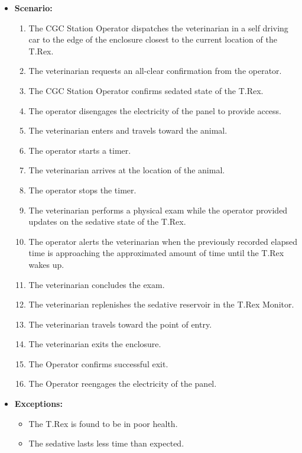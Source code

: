 \documentclass[12pt]{article}
\begin{document}
\begin{itemize}
        \item[]\textbf{Scenario:}
            \begin{enumerate}
                \item The CGC Station Operator dispatches the veterinarian in a self driving car
                to the edge of the enclosure closest to the current location of the T.Rex.
                \item The veterinarian requests an all-clear confirmation from the operator.
                \item The CGC Station Operator confirms sedated state of the T.Rex.
                \item The operator disengages the electricity of the panel to provide access.
                \item The veterinarian enters and travels toward the animal.
                \item The operator starts a timer.
                \item The veterinarian arrives at the location of the animal.
                \item The operator stops the timer. 
                \item The veterinarian performs a physical exam while the operator provided updates
                on the sedative state of the T.Rex.
                \item The operator alerts the veterinarian when the previously recorded elapsed time
                is approaching the approximated amount of time until the T.Rex wakes up.
                \item The veterinarian concludes the exam.
                \item The veterinarian replenishes the sedative reservoir in the T.Rex Monitor.
                \item The veterinarian travels toward the point of entry.
                \item The veterinarian exits the enclosure.
                \item The Operator confirms successful exit.
                \item The Operator reengages the electricity of the panel.                 
            \end{enumerate}

        \item[]\textbf{Exceptions:}
            \begin{itemize}
                \item[] The T.Rex is found to be in poor health.
                \item[] The sedative lasts less time than expected.
            \end{itemize}


\end{itemize}
\end{document}
